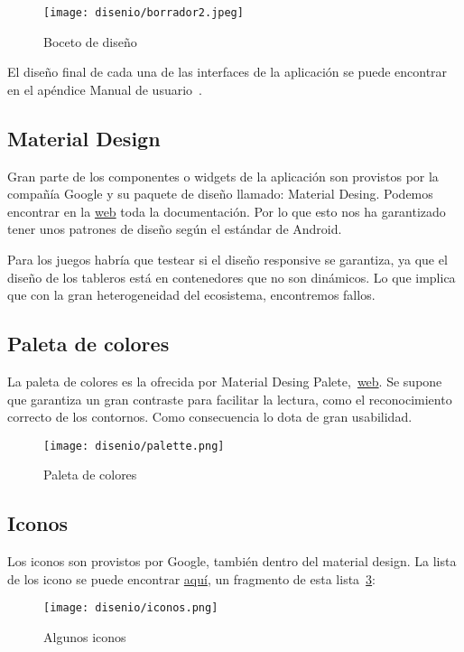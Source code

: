 \begin{figure}[H]
	\centering
	\texttt{[image: disenio/borrador2.jpeg]}
	\caption{Boceto de diseño}\label{fig:borrador}
\end{figure}

El diseño final de cada una de las interfaces de la aplicación se puede encontrar en el apéndice Manual de usuario~\pageref{manualusuario}.

\subsection{Material Design}
Gran parte de los componentes o widgets de la aplicación son provistos por la compañía Google y su paquete de diseño llamado: Material Desing. Podemos encontrar en la \href{https://material.io/develop/flutter}{web} toda la documentación. Por lo que esto nos ha garantizado tener unos patrones de diseño según el estándar de Android. 

Para los juegos habría que testear si el diseño responsive se garantiza, ya que el diseño de los tableros está en contenedores que no son dinámicos. Lo que implica que con la gran heterogeneidad del ecosistema, encontremos fallos.

\subsection{Paleta de colores}
La paleta de colores es la ofrecida por Material Desing Palete,~\href{https://material.io/design/color/the-color-system.html#color-theme-creation}{web}. Se supone que garantiza un gran contraste para facilitar la lectura, como el reconocimiento correcto de los contornos. Como consecuencia lo dota de gran usabilidad.

\begin{figure}[H]
	\centering
	\texttt{[image: disenio/palette.png]}
	\caption{Paleta de colores}\label{fig:palette}
\end{figure}

\subsection{Iconos}
Los iconos son provistos por Google, también dentro del material design. La lista de los icono se puede encontrar \href{https://material.io/resources/icons/?style=sharp}{aquí}, un fragmento de esta lista~\ref{fig:iconos}:

\begin{figure}[H]
	\centering
	\texttt{[image: disenio/iconos.png]}
	\caption{Algunos iconos}\label{fig:iconos}
\end{figure}